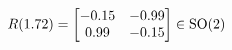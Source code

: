 \documentclass[preview]{standalone}
\begin{document}
\begin{align*}
\special{dvisvgm:raw <g id='unique000'>}R(1.72) = \begin{bmatrix} -0.15 & -0.99 \\ 0.99 & -0.15 \end{bmatrix} \in \text{SO}(2)\special{dvisvgm:raw </g>}
\end{align*}
\end{document}
